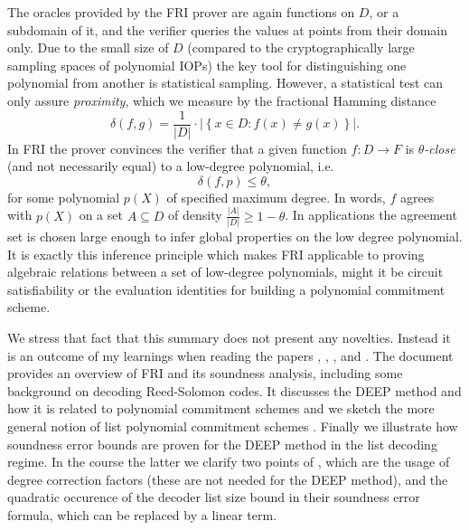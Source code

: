 \documentclass[11pt]{article}
\theoremstyle{definition}
\theoremstyle{remark}
\begin{document}
The oracles provided by the FRI prover are again functions on $D$, or a subdomain of it, and the verifier queries the values at points from their domain only.
Due to the small size of $D$ (compared to the cryptographically large sampling spaces of polynomial IOPs) the key tool for distinguishing one  polynomial from another is statistical sampling. 
However, a statistical test can only assure \textit{proximity}, which we measure by the fractional Hamming distance
\begin{equation*}
\delta(f, g) = \frac{1}{|D|}\cdot \big|\left\{x\in D: f(x)\neq g(x)\right\}\big|.
\end{equation*}
In FRI the prover convinces the verifier that a given function $f: D\longrightarrow F$ is \textit{$\theta$-close} (and not necessarily equal) to a low-degree polynomial, i.e.
\begin{equation*}
\delta(f, p) \leq \theta,
\end{equation*}
for some polynomial $p(X)$ of specified maximum degree.
In words, $f$ agrees with $p(X)$ on a set $A\subseteq D$ of density $\frac{|A|}{|D|} \geq 1-\theta$. 
In applications the agreement set is chosen large enough to infer global properties on the low degree polynomial. 
It is exactly this inference principle which makes FRI applicable to proving algebraic relations between a set of low-degree polynomials, might it be circuit satisfiability or the evaluation identities for building a polynomial commitment scheme.


We stress that fact that this summary does not present any novelties.
Instead it is an outcome of my learnings when reading the papers \cite{ProximityGaps}, \cite{DEEPFRI}, \cite{FRI}, \cite{Redshift} and \cite{ethSTARK}. 
The document provides an overview of FRI and its soundness analysis, including some background on decoding Reed-Solomon codes.
It discusses the DEEP method and how it is related to polynomial commitment schemes and we sketch the more general notion of list polynomial commitment schemes \cite{Redshift}. 
Finally we illustrate how soundness error bounds are proven for the DEEP method in the list decoding regime. 
In the course the latter we clarify two points of \cite{ethSTARK}, which are the usage of degree correction factors (these are not needed for the DEEP method), and the quadratic occurence of the decoder list size bound in their soundness error formula, which can be replaced by a linear term.   
\end{document}
